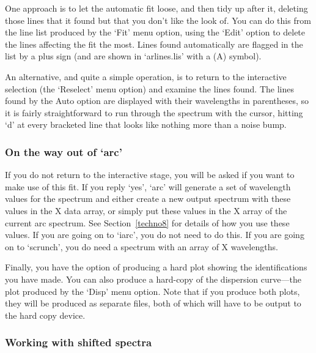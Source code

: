 \documentclass[11pt,twoside]{article}
\newcommand{\htmlref}[2]{#1}
\newcommand{\latorhtm}[2]{#1}
\newcommand{\latorhtm}[2]{#2}
\begin{document}
   One approach is to let the automatic fit loose, and then tidy up
   after it, deleting those lines that it found but that you don't like
   the look of.  You can do this from the line list produced by the
   `Fit' menu option, using the `Edit' option to delete the lines
   affecting the fit the most.  Lines found automatically are flagged in
   the list by a plus sign (and are shown in `arlines.lis' with a (A)
   symbol).

   An alternative, and quite a simple operation, is to return to the
   interactive selection (the `Reselect' menu option) and examine the
   lines found.  The lines found by the Auto option are displayed with
   their wavelengths in parentheses, so it is fairly straightforward to
   run through the spectrum with the cursor, hitting `d' at every
   bracketed line that looks like nothing more than a noise bump.


\subsubsection{\label{techno10wayout}On the way out of `arc'}

   If you do not return to the interactive stage, you will be asked if
   you want to make use of this fit.  If you reply `yes', `arc' will
   generate a set of wavelength values for the spectrum and either
   create a new output spectrum with these values in the X data array,
   or simply put these values in the X array of the current arc
   spectrum.  See
   \latorhtm{Section~\ref{techno8}}
   {the section on \htmlref{wavelengths}{techno8}}
   for details of how you use these values.  If you are going on to
   `iarc', you do not need to do this.  If you are going on to
   `scrunch', you do need a spectrum with an array of X wavelengths.

   Finally, you have the option of producing a hard plot showing the
   identifications you have made. You can also produce a hard-copy of
   the dispersion curve\latorhtm{---}{-}the plot produced by the `Disp' menu
   option.
   Note that if you produce both plots, they will be produced as
   separate files, both of which will have to be output to the hard copy
   device.


\subsubsection{\label{techno10shifted}Working with shifted spectra}
\end{document}
